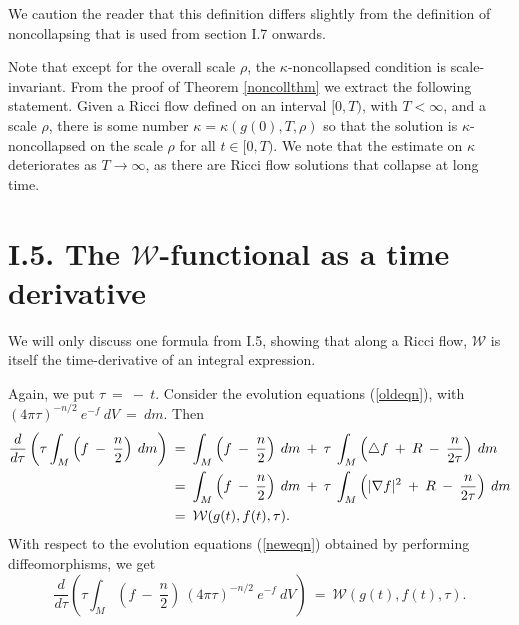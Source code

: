 \begin{remark}
  \label{rem:kl-no-local-collapsing-theorem-i-structural-remark-noncollapsing}

We caution the reader that this definition differs slightly from the
definition of noncollapsing that is used from section I.7 onwards.
\end{remark}

Note that except for the overall scale $\rho$, the $\kappa$-noncollapsed
condition is scale-invariant.
From the proof of Theorem \ref{noncollthm} we extract the following
statement. Given a Ricci flow defined on
an interval $[0, T)$, with $T < \infty$, and a scale $\rho$, there
is some number $\kappa = \kappa(g(0), T, \rho)$ so that the solution is
$\kappa$-noncollapsed on the scale $\rho$ for all $t \in [0, T)$.
We note that the estimate on $\kappa$ deteriorates as $T \rightarrow
\infty$, as there are Ricci flow solutions that collapse at
long time.

\section{I.5. The ${\mathcal W}$-functional as a time derivative} \label{I.5}

We will only discuss one formula from I.5, showing that along a Ricci flow,
${\mathcal W}$ is itself the time-derivative of an integral expression.

Again, we put $\tau \: = \: - \: t$. Consider the evolution equations
(\ref{oldeqn}), with
$(4 \pi \tau)^{-n/2} \: e^{-f} \: dV \: =\: dm$. Then
\begin{align}
\frac{d}{d\tau} \left( \tau \int_M \left( f \: - \: \frac{n}{2} \right)
\: dm \right) \: & = \:
\int_M \left( f \: - \: \frac{n}{2} \right)
\: dm \: + \: \tau \: \int_M  \left( \triangle f \: + \: R \: - \:
\frac{n}{2\tau} \right) \: dm \\
& = \:
\int_M \left( f \: - \: \frac{n}{2} \right)
\: dm \: + \: \tau \: \int_M  \left( |\nabla f|^2 \: + \: R \: - \:
\frac{n}{2\tau} \right) \: dm \notag \\
& = \: {\mathcal W}(g(t), f(t), \tau). \notag
\end{align}
With respect to the evolution equations
(\ref{neweqn}) obtained by performing diffeomorphisms, we get
\begin{equation}
\frac{d}{d\tau} \left( \tau \int_M \left( f \: - \: \frac{n}{2} \right)
\: (4 \pi \tau)^{-n/2} \: e^{-f} \: dV \right) \:
 = \: {\mathcal W}(g(t), f(t), \tau).
\end{equation}

